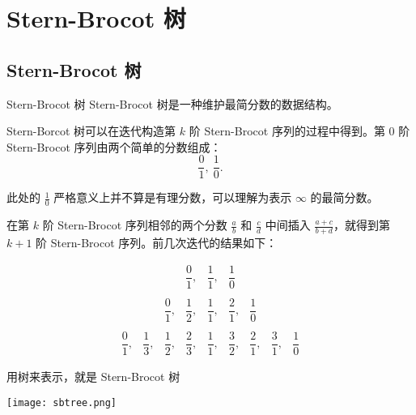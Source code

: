 \documentclass[UTF8]{beamer}
\begin{document}
    \section{Stern-Brocot 树}
    \subsection{Stern-Brocot 树}
    \begin{frame}{Stern-Brocot 树}
        Stern-Brocot 树是一种维护最简分数的数据结构。

        Stern-Borcot 树可以在迭代构造第 $k$ 阶 Stern-Brocot 序列的过程中得到。第 $0$ 阶 Stern-Brocot 序列由两个简单的分数组成：
        $$
        \frac{0}{1},\ \frac{1}{0}.
        $$

        此处的 $\frac{1}{0}$ 严格意义上并不算是有理分数，可以理解为表示 $\infty$ 的最简分数。

        在第 $k$ 阶 Stern-Brocot 序列相邻的两个分数 $\frac{a}{b}$ 和 $\frac{c}{d}$ 中间插入
        $\frac{a+c}{b+d}$，就得到第 $k+1$ 阶 Stern-Brocot 序列。前几次迭代的结果如下：

        $$
        \begin{array}{ccccccccc}
        &&&\dfrac{0}{1}, & \dfrac{1}{1}, & \dfrac{1}{0} &&&\\\\
        &&\dfrac{0}{1}, & \dfrac{1}{2}, & \dfrac{1}{1}, & \dfrac{2}{1}, & \dfrac{1}{0} &&\\\\
        \dfrac{0}{1}, & \dfrac{1}{3}, & \dfrac{1}{2}, & \dfrac{2}{3}, & \dfrac{1}{1}, & \dfrac{3}{2}, & \dfrac{2}{1}, & \dfrac{3}{1}, & \dfrac{1}{0}
        \end{array}
        $$
    \end{frame}
    \begin{frame}
        用树来表示，就是 Stern-Brocot 树
        \begin{center}
            \texttt{[image: sbtree.png]}
        \end{center}
    \end{frame}
\end{document}
